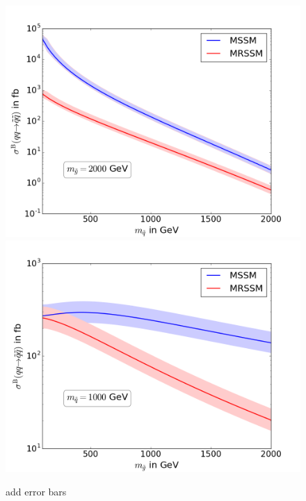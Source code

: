 \begin{figure}[!htpb]
\begin{center}
\includegraphics[scale=.5]{figures/MSSM+MRSSM_msg=2000}
\includegraphics[scale=.5]{figures/MSSM+MRSSM_msq=1000}
\caption{add error bars}
\end{center}
\end{figure}
